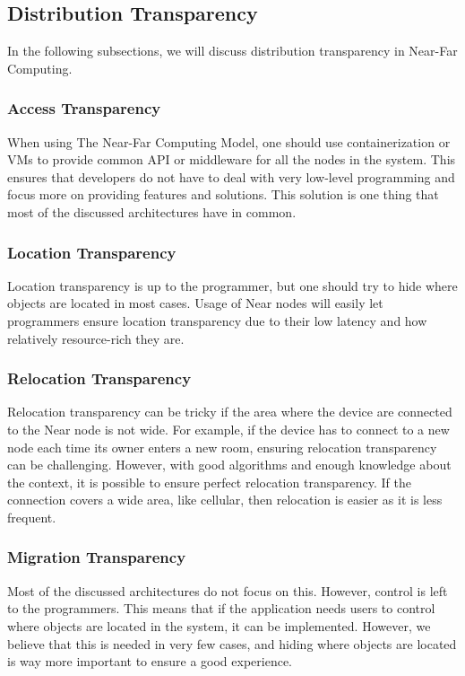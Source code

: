 \subsection{Distribution Transparency}
In the following subsections, we will discuss distribution transparency in Near-Far Computing.

\subsubsection{Access Transparency}
When using The Near-Far Computing Model, one should use containerization or VMs to provide common API or middleware for all the nodes in the system. This ensures that developers do not have to deal with very low-level programming and focus more on providing features and solutions. This solution is one thing that most of the discussed architectures have in common.

\subsubsection{Location Transparency}
Location transparency is up to the programmer, but one should try to hide where objects are located in most cases. Usage of Near nodes will easily let programmers ensure location transparency due to their low latency and how relatively resource-rich they are.

\subsubsection{Relocation Transparency}
Relocation transparency can be tricky if the area where the device are connected to the Near node is not wide. For example, if the device has to connect to a new node each time its owner enters a new room, ensuring relocation transparency can be challenging. However, with good algorithms and enough knowledge about the context, it is possible to ensure perfect relocation transparency. If the connection covers a wide area, like cellular, then relocation is easier as it is less frequent.

\subsubsection{Migration Transparency}
Most of the discussed architectures do not focus on this. However, control is left to the programmers. This means that if the application needs users to control where objects are located in the system, it can be implemented. However, we believe that this is needed in very few cases, and hiding where objects are located is way more important to ensure a good experience.

